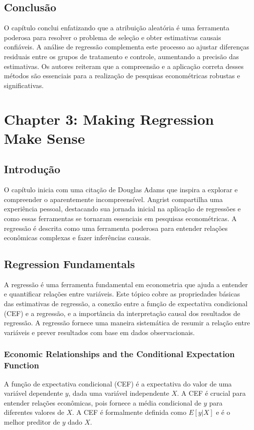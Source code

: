 \documentclass[a4paper,12pt]{article}[abntex2]
\begin{document}
\subsection{Conclusão}
O capítulo conclui enfatizando que a atribuição aleatória é uma ferramenta poderosa para resolver o problema de seleção e obter estimativas causais confiáveis. A análise de regressão complementa este processo ao ajustar diferenças residuais entre os grupos de tratamento e controle, aumentando a precisão das estimativas. Os autores reiteram que a compreensão e a aplicação correta desses métodos são essenciais para a realização de pesquisas econométricas robustas e significativas.

\newpage

\section{Chapter 3: Making Regression Make Sense}

\subsection{Introdução}
O capítulo inicia com uma citação de Douglas Adams que inspira a explorar e compreender o aparentemente incompreensível. Angrist compartilha uma experiência pessoal, destacando sua jornada inicial na aplicação de regressões e como essas ferramentas se tornaram essenciais em pesquisas econométricas. A regressão é descrita como uma ferramenta poderosa para entender relações econômicas complexas e fazer inferências causais.

\subsection{Regression Fundamentals}
A regressão é uma ferramenta fundamental em econometria que ajuda a entender e quantificar relações entre variáveis. Este tópico cobre as propriedades básicas das estimativas de regressão, a conexão entre a função de expectativa condicional (CEF) e a regressão, e a importância da interpretação causal dos resultados de regressão. A regressão fornece uma maneira sistemática de resumir a relação entre variáveis e prever resultados com base em dados observacionais.

\subsubsection{Economic Relationships and the Conditional Expectation Function}
A função de expectativa condicional (CEF) é a expectativa do valor de uma variável dependente \( y \), dada uma variável independente \( X \). A CEF é crucial para entender relações econômicas, pois fornece a média condicional de \( y \) para diferentes valores de \( X \). A CEF é formalmente definida como \( E[y|X] \) e é o melhor preditor de \( y \) dado \( X \).
\end{document}

